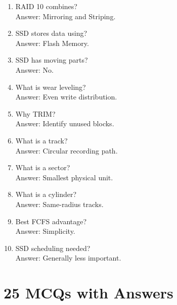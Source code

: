 \begin{enumerate}
\item RAID 10 combines?\\
Answer: Mirroring and Striping.

\item SSD stores data using?\\
Answer: Flash Memory.

\item SSD has moving parts?\\
Answer: No.

\item What is wear leveling?\\
Answer: Even write distribution.

\item Why TRIM?\\
Answer: Identify unused blocks.

\item What is a track?\\
Answer: Circular recording path.

\item What is a sector?\\
Answer: Smallest physical unit.

\item What is a cylinder?\\
Answer: Same-radius tracks.

\item Best FCFS advantage?\\
Answer: Simplicity.

\item SSD scheduling needed?\\
Answer: Generally less important.
\end{enumerate}

\section{25 MCQs with Answers}

